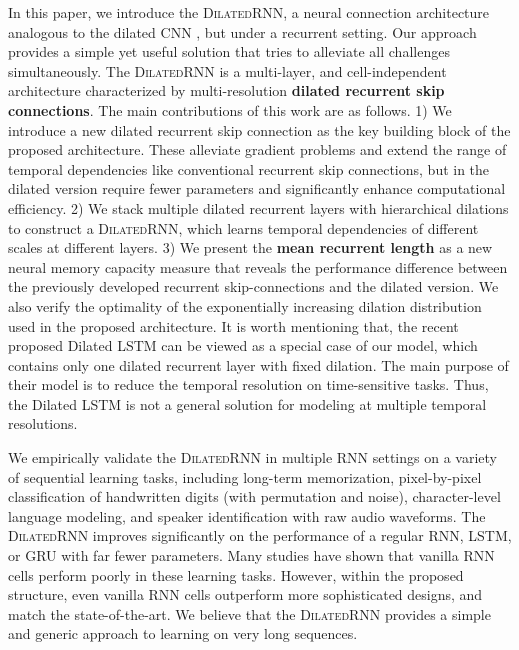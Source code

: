 \documentclass{article}
\newcommand{\algname}{\textsc{DilatedRNN }}
\newcommand{\algnamens}{\textsc{DilatedRNN}}
\begin{document}
In this paper, we introduce the \algnamens, a neural connection architecture analogous to the dilated CNN \cite{van2016wavenet, yu2015multi}, but under a recurrent setting.  Our approach provides a simple yet useful solution that tries to alleviate all challenges simultaneously.  The \algname is a multi-layer, and cell-independent architecture characterized by multi-resolution {\bf dilated recurrent skip connections}.  The main contributions of this work are as follows.  1) We introduce a new dilated recurrent skip connection as the key building block of the proposed architecture.  These alleviate gradient problems and extend the range of temporal dependencies like conventional recurrent skip connections, but in the dilated version require fewer parameters and significantly enhance computational efficiency.  2) We stack multiple dilated recurrent layers with hierarchical dilations to construct a \algnamens, which learns temporal dependencies of different scales at different layers.  3) We present the {\bf mean recurrent length} as a new neural memory capacity measure that reveals the performance difference between the previously developed recurrent skip-connections and the dilated version.  We also verify the optimality of the exponentially increasing dilation distribution used in the proposed architecture.  It is worth mentioning that,  the recent proposed Dilated LSTM \cite{vezhnevets2017feudal} can be viewed as a special case of our model, which contains only one dilated recurrent layer with fixed dilation.  The main purpose of their model is to reduce the temporal resolution on time-sensitive tasks.  Thus, the Dilated LSTM is not a general solution for modeling at multiple temporal resolutions.

We empirically validate the \algname in multiple RNN settings on a variety of sequential learning tasks, including long-term memorization, pixel-by-pixel classification of handwritten digits (with permutation and noise), character-level language modeling, and speaker identification with raw audio waveforms.  The \algname improves significantly on the performance of a regular RNN, LSTM, or GRU with far fewer parameters.  Many studies \cite{chung2014empirical, le2015simple} have shown that vanilla RNN cells perform poorly in these learning tasks.  However, within the proposed structure, even vanilla RNN cells outperform more sophisticated designs, and match the state-of-the-art.  We believe that the \algname provides a simple and generic approach to learning on very long sequences.
\end{document}
